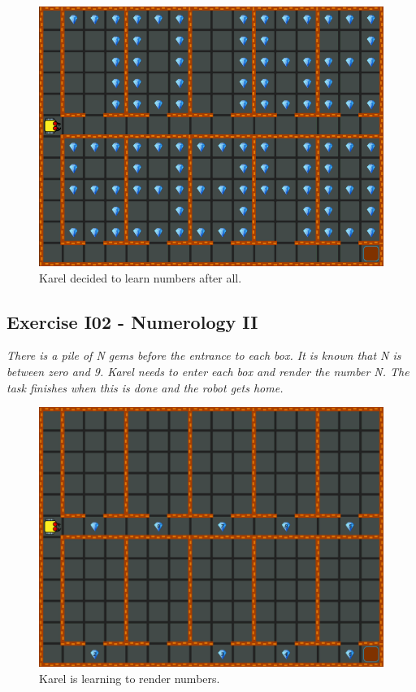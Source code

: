 \documentclass[article,A4,12pt]{llncs}
\begin{document}
{{{{\begin{figure}[!ht]
\begin{center}
\includegraphics[height=0.4\textwidth]{img/i01.png}
\end{center}
\vspace{-4mm}
\caption{Karel decided to learn numbers after all.}
\label{fig:g10}
\vspace{-4mm}
\end{figure}
\noindent
\newpage

\subsection{Exercise I02 - Numerology II}

{\em There is a pile of N gems before the entrance to each box. It is known that N is between zero and 9. 
Karel needs to enter each box and render the number N. The task finishes when this is done and the robot 
gets home.}\\[-7mm]

\begin{figure}[!ht]
\begin{center}
\includegraphics[height=0.4\textwidth]{img/i02.png}
\end{center}
\vspace{-4mm}
\caption{Karel is learning to render numbers.}
\label{fig:g11}
\vspace{-10mm}
\end{figure}
\noindent

}}}}
\end{document}
